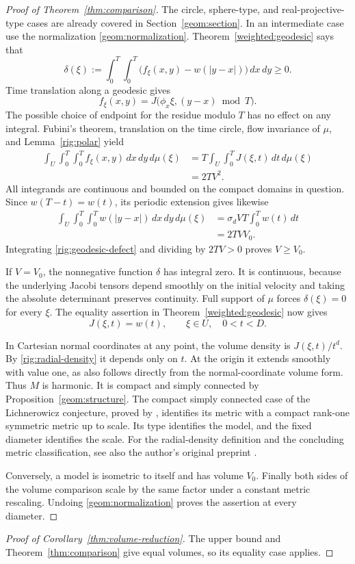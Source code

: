 \begin{proof}[Proof of Theorem~\ref{thm:comparison}]
The circle, sphere-type, and real-projective-type cases are
already covered in Section~\ref{geom:section}. In an intermediate
case use the normalization \eqref{geom:normalization}.
Theorem~\ref{weighted:geodesic} says that
\begin{equation}\label{rig:geodesic-defect}
 \delta(\xi):=\int_0^T\int_0^T
   \bigl(f_\xi(x,y)-w(|y-x|)\bigr)\,dx\,dy\ge0.
\end{equation}
Time translation along a geodesic gives
\[
 f_\xi(x,y)=J\bigl(\phi_x\xi,(y-x)\bmod T\bigr).
\]
The possible choice of endpoint for the residue modulo $T$ has
no effect on any integral. Fubini's theorem, translation on the
time circle, flow invariance of $\mu$, and
Lemma~\ref{rig:polar} yield
\begin{align*}
 \int_U\int_0^T\int_0^T f_\xi(x,y)\,dx\,dy\,d\mu(\xi)
 &=T\int_U\int_0^T J(\xi,t)\,dt\,d\mu(\xi)\\
 &=2TV^2.
\end{align*}
All integrands are continuous and bounded on the compact
domains in question. Since $w(T-t)=w(t)$, its periodic
extension gives likewise
\begin{align*}
 \int_U\int_0^T\int_0^T w(|y-x|)\,dx\,dy\,d\mu(\xi)
 &=\sigma_d V T\int_0^T w(t)\,dt\\
 &=2TVV_0.
\end{align*}
Integrating \eqref{rig:geodesic-defect} and dividing by $2TV>0$
proves $V\ge V_0$.

If $V=V_0$, the nonnegative function $\delta$ has integral zero.
It is continuous, because the underlying Jacobi tensors depend
smoothly on the initial velocity and taking the absolute
determinant preserves continuity. Full support of $\mu$ forces
$\delta(\xi)=0$ for every $\xi$. The equality assertion in
Theorem~\ref{weighted:geodesic} now gives
\begin{equation}\label{rig:radial-density}
 J(\xi,t)=w(t),\qquad \xi\in U,\quad 0<t<D.
\end{equation}

In Cartesian normal coordinates at any point, the volume
density is $J(\xi,t)/t^d$. By \eqref{rig:radial-density} it depends
only on $t$. At the origin it extends smoothly with value one,
as also follows directly from the normal-coordinate volume
form. Thus $M$ is harmonic. It is compact and simply connected
by Proposition~\ref{geom:structure}. The compact simply
connected case of the Lichnerowicz conjecture, proved by
\citet{Szabo1990}, identifies its metric with a compact rank-one
symmetric metric up to scale. Its type identifies the model,
and the fixed diameter identifies the scale.
For the radial-density definition and the concluding metric
classification, see also the author's original preprint
\citep[pp.~2--4 and Lemmas~4.9--4.10]{Szabo1988}.

Conversely, a model is isometric to itself and has volume $V_0$.
Finally both sides of the volume comparison scale by the same
factor under a constant metric rescaling. Undoing
\eqref{geom:normalization} proves the assertion at every diameter.
\end{proof}

\begin{proof}[Proof of Corollary~\ref{thm:volume-reduction}]
The upper bound and Theorem~\ref{thm:comparison} give equal
volumes, so its equality case applies.
\end{proof}

